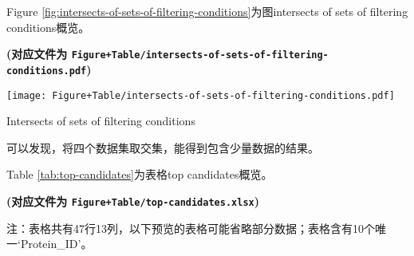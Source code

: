 \documentclass[
]{article}
\begin{document}
Figure \ref{fig:intersects-of-sets-of-filtering-conditions}为图intersects of sets of filtering conditions概览。

\textbf{(对应文件为 \texttt{Figure+Table/intersects-of-sets-of-filtering-conditions.pdf})}

\def\@captype{figure}
\begin{center}
\texttt{[image: Figure+Table/intersects-of-sets-of-filtering-conditions.pdf]}
\caption{Intersects of sets of filtering conditions}\label{fig:intersects-of-sets-of-filtering-conditions}
\end{center}

可以发现，将四个数据集取交集，能得到包含少量数据的结果。

Table \ref{tab:top-candidates}为表格top candidates概览。

\textbf{(对应文件为 \texttt{Figure+Table/top-candidates.xlsx})}

\begin{center}\begin{tcolorbox}[colback=gray!10, colframe=gray!50, width=0.9\linewidth, arc=1mm, boxrule=0.5pt]注：表格共有47行13列，以下预览的表格可能省略部分数据；表格含有10个唯一`Protein\_ID'。
\end{tcolorbox}
\end{center}
\end{document}
